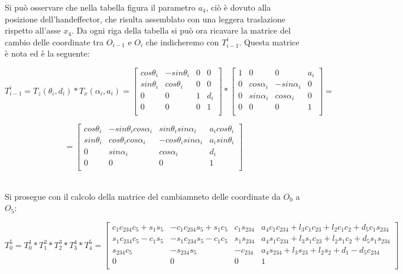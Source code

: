 \documentclass[a4paper]{article}
\begin{document}
    \begin{text}
        Si può osservare che nella tabella figura il parametro $a_4$, ciò è dovuto alla posizione dell'handeffector, che risulta assemblato con una leggera traslazione rispetto all'asse $x_4$. Da ogni riga della tabella si può ora ricavare la matrice del cambio delle coordinate tra $O_{i-1}$ e $O_i$ che indicheremo con $T_{i-1}^i$.
        Questa matrice è nota ed è la seguente:
    \end{text}
    
    \[
    T_{i-1}^i = T_z(\theta_i, d_i)*T_x(\alpha_i, a_i) = 
    \begin{bmatrix}
        cos\theta_i & -sin\theta_i & 0 & 0\\[1ex]
        sin\theta_i & cos\theta_i & 0 & 0\\[1ex]
        0 & 0 & 1 & d_i\\[1ex]
        0 & 0 & 0 & 1\\[1ex]  
    \end{bmatrix}
    *
    \begin{bmatrix}
        1 & 0 & 0 & a_i\\[1ex]
        0 & cos\alpha_i & -sin\alpha_i & 0\\[1ex]
        0 & sin\alpha_i & cos\alpha_i & 0\\[1ex]
        0 & 0 & 0 & 1\\[1ex]  
    \end{bmatrix}
    =
    \]
    
    \[
    = 
    \begin{bmatrix}
        cos\theta_i & -sin\theta_i cos\alpha_i & sin\theta_i sin\alpha_i & a_i cos\theta_i\\[1ex]
        sin\theta_i & cos\theta_i cos\alpha_i & -cos\theta_i sin\alpha_i & a_i sin\theta_i\\[1ex]
        0 & sin\alpha_i & cos\alpha_i & d_i\\[1ex]
        0 & 0 & 0 & 1\\[1ex]  
    \end{bmatrix}
    \]
    \\
    
    \begin{text}
        Si prosegue con il calcolo della matrice del cambiamneto delle coordinate da $O_0$ a $O_5$:
    \end{text}
    
    \[
    T_0^5 = T_0^1*T_1^2*T_2^3*T_3^4*T_4^5 = 
    \begin{bmatrix}
        c_1 c_{234} c_5 + s_1 s_5 & -c_1 c_{234} s_5 + s_1 c_5 & c_1 s_{234} & a_4 c_1 c_{234} + l_3 c_1 c_{23} + l_2 c_1 c_2 + d_5 c_1 s_{234}\\[1ex]
        s_1 c_{234} c_5 - c_1 s_5 & -s_1 c_{234} s_5 - c_1 c_5 & s_1 s_{234} & a_4 s_1 c_{234} + l_3 s_1 c_{23} + l_2 s_1 c_2 + d_5 s_1 s_{234}\\[1ex]
        s_{234} c_5 & -s_{234} s_5 & -c_{234} & a_4 s_{234} + l_3 s_{23} + l_2 s_2 + d_1 - d_5 c_{234}\\[1ex]
        0 & 0 & 0 & 1\\[1ex]  
    \end{bmatrix}
    \]
    
\end{document}
